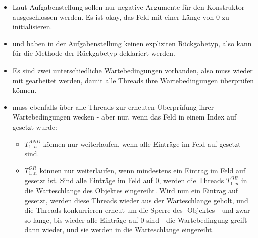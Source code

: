 \begin{itemize}
    \item Laut Aufgabenstellung sollen nur negative Argumente für den Konstruktor ausgeschlossen werden.
    Es ist okay, das Feld mit einer Länge von $0$ zu initialisieren.
    \item {} und  haben in der Aufgabenstellung keinen expliziten Rückgabetyp,
    also kann für die Methode der Rückgabetyp  deklariert werden.
    \item Es sind zwei unterschiedliche Wartebedingungen vorhanden, also muss wieder mit  
    gearbeitet werden, damit alle Threads ihre Wartebedingungen überprüfen können.
    \item {} muss ebenfalls über  alle Threads zur erneuten Überprüfung ihrer Wartebedingungen wecken - aber nur, wenn das Feld in einem Index auf  gesetzt wurde:
        \begin{itemize}
            \item $T^{AND}_{1..n}$ können nur weiterlaufen, wenn alle Einträge im Feld auf  gesetzt sind.
            \item $T^{OR}_{1..n}$ können nur weiterlaufen, wenn mindestens ein Eintrag im Feld auf  gesetzt ist.
            Sind alle Einträge im Feld auf $0$, werden die Threads $T^{OR}_{1..n}$ in die Warteschlange des Objektes
            eingereiht.
            Wird nun ein Eintrag auf  gesetzt, werden diese Threads wieder aus der Warteschlange geholt, und
            die Threads konkurrieren erneut um die Sperre des -Objektes - und zwar so lange, bis wieder alle Einträge auf $0$ sind - die Wartebedingung greift dann wieder, und sie werden in die Warteschlange eingereiht.
        \end{itemize}
\end{itemize}
